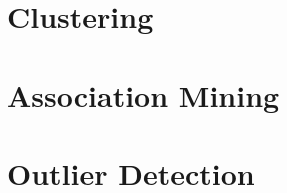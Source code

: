 
\setlength{\headheight}{14pt}
\usepackage[utf8]{inputenc}

%
\rhead{\today}
\lfoot{}
\cfoot{}
\rfoot{\thepage}

\let\oldlongtable\longtable
\let\endoldlongtable\endlongtable
\renewenvironment{longtable}{\rowcolors{0}{white}{myColor}\oldlongtable} {
\endoldlongtable}




\newpage
\renewcommand{\cftsecleader}{\cftdotfill{\cftdotsep}}
\tableofcontents

\newpage
\setcounter{secnumdepth}{3}

\newpage


\section{Clustering}



\section{Association Mining}



\section{Outlier Detection}




%
%


